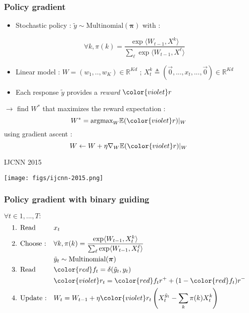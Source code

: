 \documentclass{beamer}
\begin{document}
\begin{frame}\frametitle{Policy gradient \cite{Wil92}}
	
	\begin{itemize}
		\item Stochastic policy : $\tilde{y} \sim \text{Multinomial}(\boldsymbol{\pi})$ with :
		\begin{exampleblock}{}
			$$ \forall k,  \pi(k) = \frac{\exp\langle W_{t-1}, X^k\rangle}{\sum_{\ell}\exp\langle W_{t-1}, X^\ell\rangle}$$
		\end{exampleblock}
		\item Linear model : $W = (w_1,..,w_K) \in \mathbb{R}^{K d}$ ; 
			$X_t^k \triangleq (\vec{0}, ...,  x_t, ..., \vec{0}) \in \mathbb{R}^{K d}$
		\item Each response $\tilde{y}$ provides a \emph{reward} ${\color{violet}r}$
	\end{itemize}
	    
    $\rightarrow$ find $W^*$ that maximizes the reward expectation :
		$$ W^*  = \text{argmax}_W \mathbb{E}({\color{violet}r})|_W$$
		using gradient ascent : 
		$$ W \leftarrow W + \eta \nabla_W \mathbb{E}({\color{violet}r})|_W $$

\end{frame}

\begin{frame}
	IJCNN 2015
	\newline
	\newline
	\centerline{\texttt{[image: figs/ijcnn-2015.png]}}
\end{frame}

\begin{frame}\frametitle{Policy gradient {\color{red} with binary guiding}}
	\begin{block}{}
		$\forall t \in 1,...,T :$
		\begin{align*}
		&\text{1. Read } 
		&& x_t 
		\\
		&\text{2. Choose :} 
		&& \forall k, \pi(k) = \frac{\exp\langle W_{t-1}, X_t^k\rangle}{\sum_{\ell}\exp\langle W_{t-1}, X_t^\ell\rangle}
		\\
		&
		&& \tilde{y}_t \sim \text{Multinomial}(\boldsymbol{\pi})
		\\
		&\text{3. Read } 
		&& {\color{red} f_t = \delta(\tilde{y}_t ,y_t)} 
		\\
		&
		&& {\color{violet}r_t} =  {\color{red} f_t} r^+ +(1-{\color{red} f_t}) r^-
		\\
		&\text{4. Update :} 
		&& W_t = W_{t-1} + \eta {\color{violet}r_t} \left(X_t^{\tilde{y}_t} - \sum_k \pi(k) X_t^k \right) 
		\end{align*}
	\end{block}	
	
\end{frame}
\end{document}
